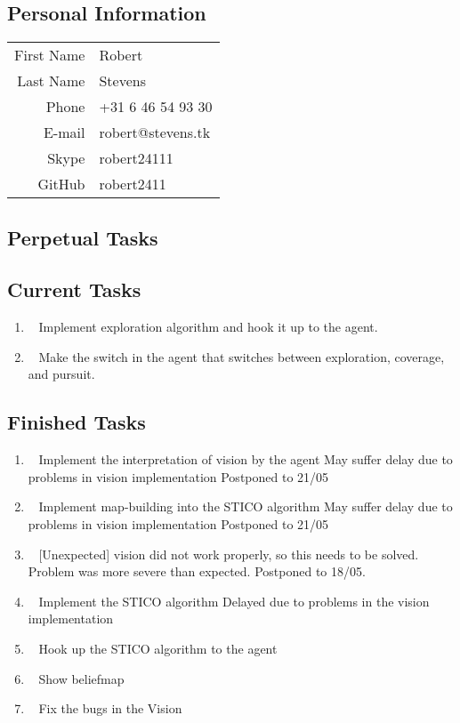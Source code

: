 \subsection{Personal Information}
\begin{table}[h!]
	\begin{tabular}{rl}
	First Name 	& Robert\\
	Last Name	& Stevens\\
	Phone		& +31 6 46 54 93 30\\
	E-mail		& robert@stevens.tk\\
	Skype		& robert24111\\
	GitHub		& robert2411
\end{tabular}
\end{table}
    
\subsection{Perpetual Tasks}
	
\subsection{Current Tasks}
	\begin{enumerate}
		\item~
			Implement exploration algorithm and hook it up to the agent.
		\item~
			Make the switch in the agent that switches between exploration, coverage, and pursuit.
	\end{enumerate}
    
\subsection{Finished Tasks}
	\begin{enumerate}
		\item~
		Implement the interpretation of vision by the agent
			\subitem May suffer delay due to problems in vision implementation
			\subitem Postponed to 21/05
		\item~
		Implement map-building into the STICO algorithm
			\subitem May suffer delay due to problems in vision implementation
			\subitem Postponed to 21/05
		\item~
		[Unexpected] vision did not work properly, so this needs to be solved.
			\subitem Problem was more severe than expected. Postponed to 18/05.
		\item~
		Implement the STICO algorithm
			\subitem Delayed due to problems in the vision implementation
		\item~
		Hook up the STICO algorithm to the agent
		\item~\marginpar{-}
			Show beliefmap
		\item~
			Fix the bugs in the Vision
	\end{enumerate}